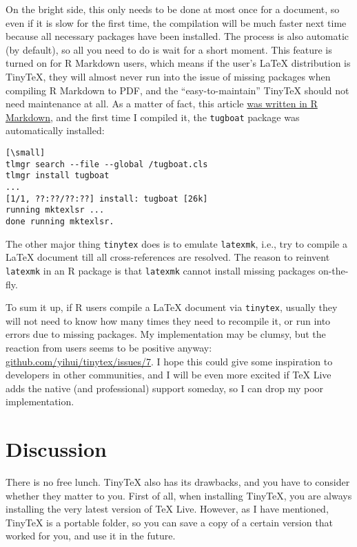 \documentclass{ltugboat}
\def\tinytex{\texttt{tinytex}}
\begin{document}
On the bright side, this only needs to be done at most once for a
document, so even if it is slow for the first time, the compilation will
be much faster next time because all necessary packages have been
installed. The process is also automatic (by default), so all you need
to do is wait for a short moment. This feature is turned on for R
Markdown \cite{R-rmarkdown} users, which means if the user's \LaTeX{}
distribution is TinyTeX, they will almost never run into the issue of
missing packages when compiling R Markdown to PDF, and the
``easy-to-maintain'' TinyTeX should not need maintenance at all. As a
matter of fact, this article
\href{https://github.com/yihui/tinytex/blob/master/TUGboat/tinytex.Rmd}{was
written in R Markdown}, and the first time I compiled it, the
\texttt{tugboat} package was automatically installed:

\begin{verbatim}[\small]
tlmgr search --file --global /tugboat.cls
tlmgr install tugboat
...
[1/1, ??:??/??:??] install: tugboat [26k]
running mktexlsr ...
done running mktexlsr.
\end{verbatim}

The other major thing \tinytex{} does is to emulate
\texttt{latexmk}, i.e., try to compile a \LaTeX{} document till all
cross-references are resolved. The reason to reinvent \texttt{latexmk}
in an R package is that \texttt{latexmk} cannot install missing packages
on-the-fly.

To sum it up, if R users compile a \LaTeX{} document via \tinytex{},
usually they will not need to know how many times they need to recompile
it, or run into errors due to missing packages. My implementation may be
clumsy, but the reaction from users seems to be positive anyway:
\url{github.com/yihui/tinytex/issues/7}. I hope this could give
some inspiration to developers in other communities, and I will be even
more excited if \TeX{} Live adds the native (and professional) support
someday, so I can drop my poor implementation.

\hypertarget{discussion}{%
\section{Discussion}\label{discussion}}

There is no free lunch. TinyTeX also has its drawbacks, and you have to
consider whether they matter to you. First of all, when installing
TinyTeX, you are always installing the very latest version of \TeX{} Live.
However, as I have mentioned, TinyTeX is a portable folder, so you can
save a copy of a certain version that worked for you, and use it in the
future.
\end{document}
